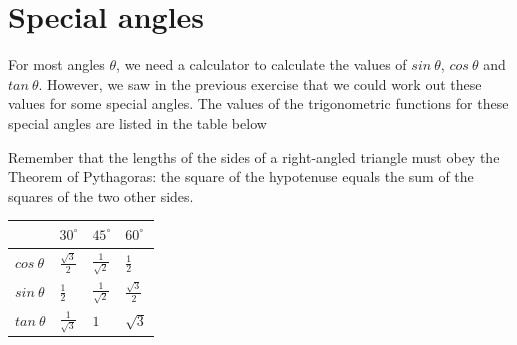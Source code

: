 \section{Special angles}
For most angles $\theta $, we need a calculator to calculate the values of $sin~\theta $, $cos~\theta $ and $tan~\theta $. However, we saw in the previous exercise that we could work out these values for some special angles. The values of the trigonometric functions for these special angles are listed in the table below \par
Remember that the lengths of the sides of a right-angled triangle must obey the Theorem of Pythagoras: the square of the hypotenuse equals the sum of the squares of the two other sides.\par 
\begin{table}[H]
\begin{center}
\setlength{\extrarowheight}{2.5pt}

\begin{tabular}{|m{1.2cm}|l|l|l|}\hline
&

${30}^{\circ }$
&
${45}^{\circ }$
&
${60}^{\circ }$



\\ \hline
$cos~\theta $
 &
$\frac{\sqrt{3}}{2}$
&
$\frac{1}{\sqrt{2}}$
&
$\frac{1}{2}$

\\ \hline
$sin~\theta $
&

$\frac{1}{2} $
&
$\frac{1}{\sqrt{2}}$
&
$\frac{\sqrt{3}}{2}$

\\ \hline
$tan~\theta $
&

$\frac{1}{\sqrt{3}}$
&
$1$ &
$\sqrt{3}$



\\ \hline
\end{tabular}
\end{center}
\end{table}


